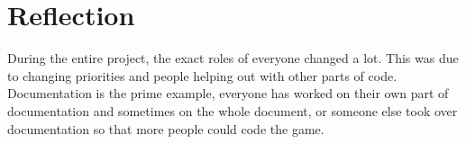 \section{Reflection} %
\label{sec:reflection}
    During the entire project, the exact roles of everyone changed a lot. This was due to changing priorities and people helping out with other parts of code. Documentation is the prime example, everyone has worked on their own part of documentation and sometimes on the whole document, or someone else took over documentation so that more people could code the game.

